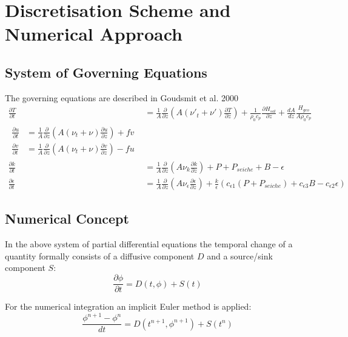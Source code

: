 \documentclass[paper=a4, fontsize=12pt]{article}
\begin{document}
\section{Discretisation Scheme and Numerical Approach}
\subsection{System of Governing Equations}
The governing equations are described in Goudsmit et al. 2000
\begin{align}
	\frac{\partial T}{\partial t} &= \frac{1}{A}\frac{\partial}{\partial z}\left(A(\nu'_t + \nu')\frac{\partial T}{\partial z}\right)+\frac{1}{\rho_0 c_p}\frac{\partial H_{sol}}{\partial z}+\frac{dA}{dz}\frac{H_{geo}}{A\rho_0 c_p}\\
	\begin{split}
		\frac{\partial u}{\partial t} &= \frac{1}{A}\frac{\partial}{\partial z}\left(A(\nu_t + \nu)\frac{\partial u}{\partial z}\right) + fv\\
		\frac{\partial v}{\partial t} &= \frac{1}{A}\frac{\partial}{\partial z}\left(A(\nu_t + \nu)\frac{\partial v}{\partial z}\right) - fu
	\end{split}\\
	\frac{\partial k}{\partial t} &= \frac{1}{A}\frac{\partial}{\partial z}\left(A\nu_k\frac{\partial k}{\partial z}\right) + P + P_{seiche} + B - \epsilon\\
	\frac{\partial \epsilon}{\partial t} &= \frac{1}{A}\frac{\partial}{\partial z}\left(A\nu_{\epsilon}\frac{\partial \epsilon}{\partial z}\right) + \frac{k}{\epsilon}\left(c_{\epsilon 1}\left(P+P_{seiche}\right)+c_{\epsilon 3}B-c_{\epsilon 2}\epsilon\right)
\end{align}

\subsection{Numerical Concept}
In the above system of partial differential equations the temporal change of a quantity formally consists of a diffusive component $D$ and a source/sink component $S$:
\begin{equation}
	\frac{\partial\phi}{\partial t} = D(t, \phi) + S(t)
\end{equation}

\noindent For the numerical integration an implicit Euler method is applied:
\begin{equation}
	\frac{\phi^{n+1}-\phi^n}{dt} = D(t^{n+1}, \phi^{n+1}) + S(t^{n}) 
\end{equation}
\end{document}
